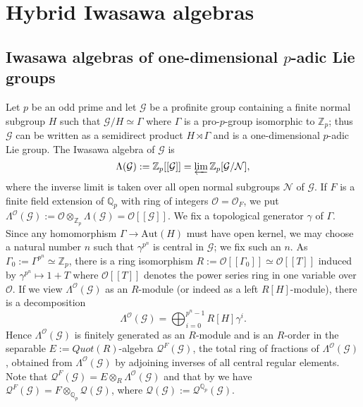 \documentclass[12pt]{amsart}
\theoremstyle{plain}
\theoremstyle{remark}
\theoremstyle{definition}
\numberwithin{equation}{section}
\begin{document}
\section{Hybrid Iwasawa algebras}\label{sec:hybrid-Iwasawa-alg}

\subsection{Iwasawa algebras of one-dimensional $p$-adic Lie groups}\label{subsec:Iwasawa-algebras}
Let $p$ be an odd prime and let $\mathcal{G}$ be a profinite group containing a finite normal subgroup $H$ such that $\mathcal{G}/H \simeq \Gamma$ where $\Gamma$ is a pro-$p$-group isomorphic to ${\mathbb{Z}}_{p}$;
thus $\mathcal{G}$ can be written as a semidirect product $H \rtimes \Gamma$ and is a one-dimensional $p$-adic Lie group.
The Iwasawa algebra of $\mathcal{G}$ is
\[
\Lambda(\mathcal{G}) := {\mathbb{Z}}_{p}[[\mathcal{G}]] = \varprojlim {\mathbb{Z}}_{p}[\mathcal{G}/\mathcal{N}],
\]
where the inverse limit is taken over all open normal subgroups $\mathcal{N}$ of $\mathcal{G}$.
If $F$ is a finite field extension of ${\mathbb{Q}}_{p}$  with ring of integers $\mathcal{O}=\mathcal{O}_{F}$,
we put $\Lambda^{\mathcal{O}}(\mathcal{G}) := \mathcal{O} \otimes_{{\mathbb{Z}}_{p}} \Lambda(\mathcal{G}) = \mathcal{O}[[\mathcal{G}]]$.
We fix a topological generator $\gamma$ of $\Gamma$.
Since any homomorphism $\Gamma \rightarrow {\mathrm{Aut}}(H)$ must have open kernel, we may choose a natural number $n$ such that $\gamma^{p^n}$ is central in $\mathcal{G}$; we fix such an $n$.
 As $\Gamma_{0} := \Gamma^{p^n} \simeq {\mathbb{Z}}_{p}$, there is a ring isomorphism
$R:=\mathcal{O}[[\Gamma_{0}]] \simeq \mathcal{O}[[T]]$ induced by $\gamma^{p^n} \mapsto 1+T$
where $\mathcal{O}[[T]]$ denotes the power series ring in one variable over $\mathcal{O}$.
If we view $\Lambda^{\mathcal{O}}(\mathcal{G})$ as an $R$-module (or indeed as a left $R[H]$-module), there is a decomposition
\begin{equation}\label{eq:Lambda-R-decomp}
\Lambda^{\mathcal{O}}(\mathcal{G}) = \bigoplus_{i=0}^{p^n-1} R[H] \gamma^{i}.
\end{equation}
Hence $\Lambda^{\mathcal{O}}(\mathcal{G})$ is finitely generated as an $R$-module and is an $R$-order in the separable $E:=Quot(R)$-algebra
$\mathcal{Q}^{F} (\mathcal{G})$, the total ring of fractions of $\Lambda^{\mathcal{O}}(\mathcal{G})$, obtained
from $\Lambda^{\mathcal{O}}(\mathcal{G})$ by adjoining inverses of all central regular elements.
Note that $\mathcal{Q}^{F} (\mathcal{G}) =  E \otimes_{R} \Lambda^{\mathcal{O}}(\mathcal{G})$ and that by
\cite[Lemma 1]{MR2114937} we have $\mathcal{Q}^{F} (\mathcal{G}) = F \otimes_{{\mathbb{Q}}_{p}} \mathcal{Q}(\mathcal{G})$,
where $\mathcal{Q}(\mathcal{G}) := \mathcal{Q}^{{\mathbb{Q}}_{p}}(\mathcal{G})$.
\end{document}

